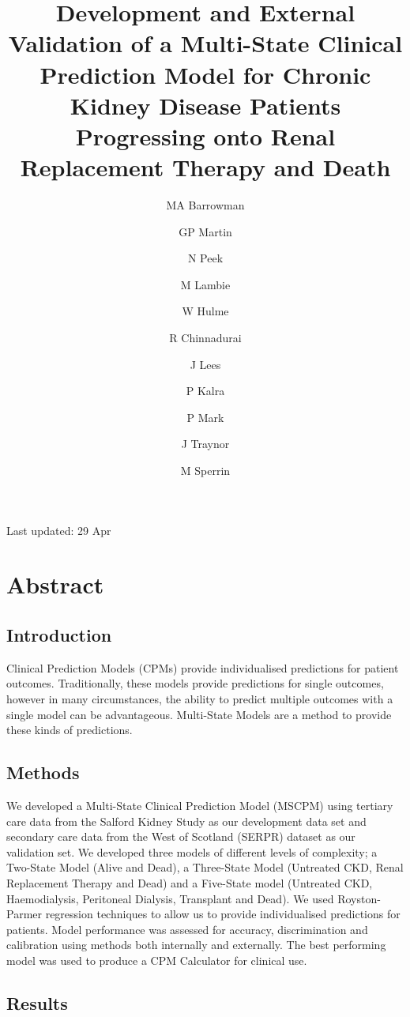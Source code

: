 \documentclass[
]{article}
\title{Development and External Validation of a Multi-State Clinical Prediction Model for Chronic Kidney Disease Patients Progressing onto Renal Replacement Therapy and Death}
\author{MA Barrowman \and GP Martin \and N Peek \and M Lambie \and W Hulme \and R Chinnadurai \and J Lees \and P Kalra \and P Mark \and J Traynor \and M Sperrin}
\date{}
\begin{document}
\maketitle

{
\setcounter{tocdepth}{2}
\tableofcontents
}
Last updated: 29 Apr

\hypertarget{abstract}{%
\section*{Abstract}\label{abstract}}

\hypertarget{introduction}{%
\subsection*{Introduction}\label{introduction}}

Clinical Prediction Models (CPMs) provide individualised predictions for patient outcomes. Traditionally, these models provide predictions for single outcomes, however in many circumstances, the ability to predict multiple outcomes with a single model can be advantageous. Multi-State Models are a method to provide these kinds of predictions.

\hypertarget{methods}{%
\subsection*{Methods}\label{methods}}

We developed a Multi-State Clinical Prediction Model (MSCPM) using tertiary care data from the Salford Kidney Study as our development data set and secondary care data from the West of Scotland (SERPR) dataset as our validation set. We developed three models of different levels of complexity; a Two-State Model (Alive and Dead), a Three-State Model (Untreated CKD, Renal Replacement Therapy and Dead) and a Five-State model (Untreated CKD, Haemodialysis, Peritoneal Dialysis, Transplant and Dead). We used Royston-Parmer regression techniques to allow us to provide individualised predictions for patients. Model performance was assessed for accuracy, discrimination and calibration using methods both internally and externally. The best performing model was used to produce a CPM Calculator for clinical use.

\hypertarget{results}{%
\subsection*{Results}\label{results}}
\end{document}
